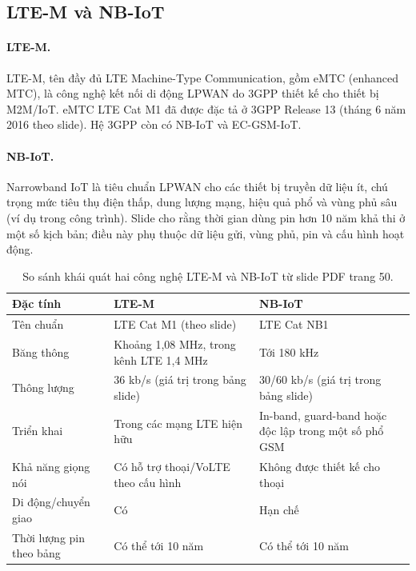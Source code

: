 \subsection{LTE-M và NB-IoT}
\paragraph{LTE-M.} LTE-M, tên đầy đủ LTE Machine-Type Communication, gồm eMTC (enhanced MTC), là công nghệ kết nối di động LPWAN do 3GPP thiết kế cho thiết bị M2M/IoT. eMTC LTE Cat M1 đã được đặc tả ở 3GPP Release 13 (tháng 6 năm 2016 theo slide). Hệ 3GPP còn có NB-IoT và EC-GSM-IoT. 

\paragraph{NB-IoT.} Narrowband IoT là tiêu chuẩn LPWAN cho các thiết bị truyền dữ liệu ít, chú trọng mức tiêu thụ điện thấp, dung lượng mạng, hiệu quả phổ và vùng phủ sâu (ví dụ trong công trình). Slide cho rằng thời gian dùng pin hơn 10 năm khả thi ở một số kịch bản; điều này phụ thuộc dữ liệu gửi, vùng phủ, pin và cấu hình hoạt động. 

\begin{table}[htbp]\centering\small
\caption{So sánh khái quát hai công nghệ LTE-M và NB-IoT từ slide PDF trang 50.}
\begin{tabularx}{\textwidth}{p{3.4cm}XX}\toprule
Đặc tính & LTE-M & NB-IoT\\\midrule
Tên chuẩn & LTE Cat M1 (theo slide) & LTE Cat NB1\\
Băng thông & Khoảng 1,08 MHz, trong kênh LTE 1,4 MHz & Tới 180 kHz\\
Thông lượng & 36 kb/s (giá trị trong bảng slide) & 30/60 kb/s (giá trị trong bảng slide)\\
Triển khai & Trong các mạng LTE hiện hữu & In-band, guard-band hoặc độc lập trong một số phổ GSM\\
Khả năng giọng nói & Có hỗ trợ thoại/VoLTE theo cấu hình & Không được thiết kế cho thoại\\
Di động/chuyển giao & Có & Hạn chế\\
Thời lượng pin theo bảng & Có thể tới 10 năm & Có thể tới 10 năm\\\bottomrule
\end{tabularx}\end{table}

